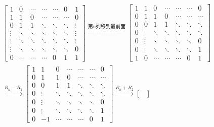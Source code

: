 \documentclass{article}
\begin{document}
\begin{align*}
  \begin{bmatrix}
    1      & 0      & \cdots & \cdots & \cdots & 0      & 1      \\
    1      & 1      & 0      & \cdots & \cdots & \cdots & 0      \\
    0      & 1      & 1      & \ddots & \ddots & \ddots & \vdots \\
    \vdots & \ddots & \ddots & \ddots & \ddots & \ddots & \vdots \\
    \vdots & \ddots & \ddots & \ddots & \ddots & \ddots & \vdots \\
    \vdots & \ddots & \ddots & \ddots & \ddots & \ddots & 0      \\
    0      & \cdots & \cdots & \cdots & 0      & 1      & 1
  \end{bmatrix}
  \xrightarrow{\text{第n列移到最前面}}
  \begin{bmatrix}
    1 & 1      & 0      & \cdots & \cdots & \cdots & 0      \\
    0 & 1      & 1      & 0      & \cdots & \cdots & \cdots \\
    0 & 0      & 1      & 1      & \ddots & \ddots & \ddots \\
    0 & \vdots & \ddots & \ddots & \ddots & \ddots & \ddots \\
    0 & \vdots & \ddots & \ddots & \ddots & \ddots & 0      \\
    0 & \vdots & \ddots & \ddots & \ddots & \ddots & 1      \\
    1 & 0      & \cdots & \cdots & \cdots & 0      & 1
  \end{bmatrix} \\
  \xrightarrow{R_n - R_1}
  \begin{bmatrix}
    1 & 1      & 0      & \cdots & \cdots & \cdots & 0      \\
    0 & 1      & 1      & 0      & \cdots & \cdots & \cdots \\
    0 & 0      & 1      & 1      & \ddots & \ddots & \ddots \\
    0 & \vdots & \ddots & \ddots & \ddots & \ddots & \ddots \\
    0 & \vdots & \ddots & \ddots & \ddots & \ddots & 0      \\
    0 & \vdots & \ddots & \ddots & \ddots & \ddots & 1      \\
    0 & -1     & \cdots & \cdots & \cdots & 0      & 1
  \end{bmatrix}
  \xrightarrow{R_n + R_2}
  \begin{bmatrix}

\end{bmatrix}
\end{align*}
\end{document}

